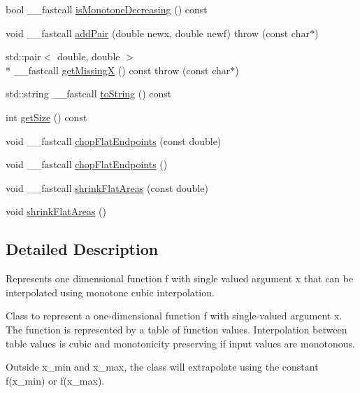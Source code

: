 \begin{DoxyCompactItemize}
\item 
bool \+\_\+\+\_\+fastcall \hyperlink{class_monot_cubic_interpolator_a16053d8c0ea7c13670d9bdeaf5e12f88}{is\+Monotone\+Decreasing} () const 
\item 
void \+\_\+\+\_\+fastcall \hyperlink{class_monot_cubic_interpolator_ac7f577558983cba8354d48cc63ed03e9}{add\+Pair} (double newx, double newf)  throw (const char$\ast$)
\item 
std\+::pair$<$ double, double $>$\\*
 \+\_\+\+\_\+fastcall \hyperlink{class_monot_cubic_interpolator_afac0f94e1b1ac2e09faa4701bd5c7972}{get\+Missing\+X} () const   throw (const char$\ast$)
\item 
std\+::string \+\_\+\+\_\+fastcall \hyperlink{class_monot_cubic_interpolator_a4c7fe5a8f84b602eb18393bea9c20edd}{to\+String} () const 
\item 
int \hyperlink{class_monot_cubic_interpolator_abbed9ff41f6068bfa96da109761cfe00}{get\+Size} () const 
\item 
void \+\_\+\+\_\+fastcall \hyperlink{class_monot_cubic_interpolator_ac8ace480576f6eea1cf061c40ff1df4d}{chop\+Flat\+Endpoints} (const double)
\item 
void \+\_\+\+\_\+fastcall \hyperlink{class_monot_cubic_interpolator_aa08aaef97ba3547175bb15d7a55c5611}{chop\+Flat\+Endpoints} ()
\item 
void \+\_\+\+\_\+fastcall \hyperlink{class_monot_cubic_interpolator_ac4ca43c828d4a9ad4b15cf5fd808b152}{shrink\+Flat\+Areas} (const double)
\item 
void \hyperlink{class_monot_cubic_interpolator_afec063b4c7537300ed99905d025c0ef6}{shrink\+Flat\+Areas} ()
\end{DoxyCompactItemize}


\subsection{Detailed Description}
Represents one dimensional function f with single valued argument x that can be interpolated using monotone cubic interpolation. 

Class to represent a one-\/dimensional function f with single-\/valued argument x. The function is represented by a table of function values. Interpolation between table values is cubic and monotonicity preserving if input values are monotonous.

Outside x\+\_\+min and x\+\_\+max, the class will extrapolate using the constant f(x\+\_\+min) or f(x\+\_\+max).

